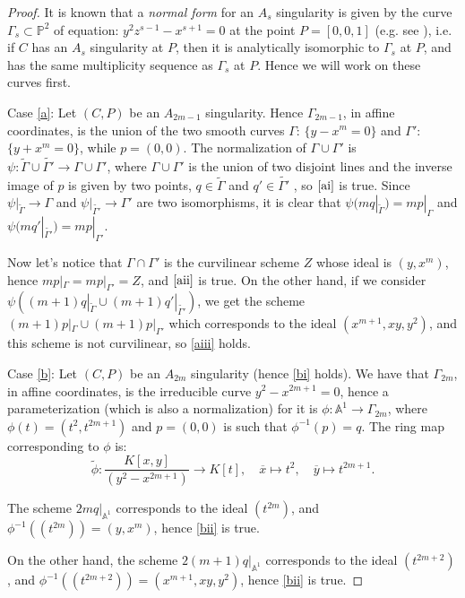 \documentclass[draft]{amsart}
\theoremstyle{definition}
\theoremstyle{remark}
\theoremstyle{definition}
\newcommand{\PP}{\mathbb{P}}
\def\dd{\medskip \par \noindent}
\begin{document}
\begin{proof} 

It is known that a {\it normal form} for an $A_s$ singularity is given by the curve $\Gamma_s \subset \PP^2$ of equation: $y^2z^{s-1}-x^{s+1}=0$ at the point $P = [0,0,1]$ (e.g. see \cite{refHa, refKP}), i.e. if $C$ has an $A_s$ singularity at $P$, then it is  analytically isomorphic to $\Gamma_s$ at $P$, and has the same multiplicity sequence as $\Gamma_s$ at $P$. Hence we will work on these curves first. 

\dd Case \eqref{a}: Let $(C,P)$ be an $A_{2m-1}$ singularity. Hence $\Gamma_{2m-1}$, in affine coordinates, is the union of the two smooth curves $\Gamma$: $\{y-x^m=0\}$ and $\Gamma '$: $\{y+x^m=0\}$, while $p=(0,0)$. The normalization of $\Gamma \cup \Gamma '$ is  $\psi :\tilde{\Gamma} \cup \tilde{\Gamma '}\rightarrow \Gamma \cup \Gamma '$, where $\Gamma \cup \Gamma '$ is the union of two disjoint lines and the inverse image of $p$ is given by two points, $q\in \tilde{\Gamma}$ and  $q'\in \tilde{\Gamma '}$ , so $\eqref{ai}$ is true. Since $\psi |_{\tilde{\Gamma}} \to \Gamma $ and $\psi |_{\tilde{\Gamma'}} \to \Gamma' $ are two isomorphisms, it is clear that  $\psi(mq|_{\tilde{\Gamma}}) = mp|_{\Gamma}$ and $\psi(mq'|_{\tilde{\Gamma '}}) = mp|_{\Gamma '}$.

Now let's notice that $\Gamma \cap \Gamma'$ is the curvilinear scheme $Z$ whose ideal is $(y,x^m)$, hence $mp|_{\Gamma} = mp|_{\Gamma'} = Z$, and $\eqref{aii}$ is true.  On the other hand, if we consider $\psi((m+1)q|_{\tilde{\Gamma}} \cup (m+1)q'|_{\tilde{\Gamma '}})$, we get the scheme $(m+1)p|_{\Gamma} \cup (m+1)p|_{\Gamma '}$ which corresponds to the ideal $(x^{m+1},xy,y^2)$, and this scheme is not curvilinear, so \eqref{aiii} holds.

 \dd Case \eqref{b}: Let $(C,P)$ be an $A_{2m}$ singularity (hence \eqref{bi} holds). We have that $\Gamma_{2m}$, in affine coordinates, is the irreducible curve $y^2-x^{2m+1}=0$, hence a parameterization (which is also a normalization) for it is $\phi : \mathbb{A}^1 \to \Gamma_{2m}$, where $\phi(t) = (t^2,t^{2m+1})$ and $p=(0,0)$ is such that $\phi^{-1}(p)=q$.  The ring map corresponding to $\phi$ is:  
$$
\tilde{\phi} : \frac{K[x,y]}{(y^2-x^{2m+1})} \to K[t], \quad \overline{x} \mapsto t^2, \quad \overline{y} \mapsto t^{2m+1}.
$$ 

The scheme $2mq|_{\mathbb{A}^1}$ corresponds to the ideal $(t^{2m})$, and $\phi^{-1} ((t^{2m}))= (y,x^m) $, hence \eqref{bii} is true. 

On the other hand, the scheme $2(m+1)q|_{\mathbb{A}^1}$ corresponds to the ideal $(t^{2m+2})$, and $\phi^{-1} ((t^{2m+2}))= (x^{m+1},xy,y^2) $, hence \eqref{bii} is true. 


\end{proof}
\end{document}
